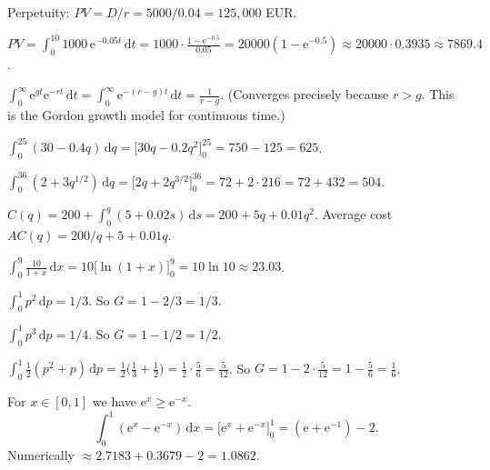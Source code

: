 \begin{solutions}
  \item Perpetuity: $PV=D/r=5000/0.04=125{,}000$ EUR.

  \item $\displaystyle PV=\int_{0}^{10} 1000\,\mathrm{e}^{-0.05t}\,\mathrm{d}t
        =1000\cdot\frac{1-\mathrm{e}^{-0.5}}{0.05}=20000(1-\mathrm{e}^{-0.5})
        \approx 20000\cdot 0.3935\approx 7869.4$.

  \item $\displaystyle\int_{0}^{\infty} \mathrm{e}^{gt}\mathrm{e}^{-rt}\,\mathrm{d}t
        =\int_{0}^{\infty} \mathrm{e}^{-(r-g)t}\,\mathrm{d}t=\frac{1}{r-g}$.
        (Converges precisely because $r>g$. This is the Gordon growth
        model for continuous time.)

  \item $\displaystyle\int_{0}^{25} (30-0.4q)\,\mathrm{d}q
        =\bigl[30q-0.2q^{2}\bigr]_{0}^{25}=750-125=625$.

  \item $\displaystyle\int_{0}^{36} (2+3q^{1/2})\,\mathrm{d}q
        =\bigl[2q+2q^{3/2}\bigr]_{0}^{36}=72+2\cdot 216=72+432=504$.

  \item $\displaystyle C(q)=200+\int_{0}^{q} (5+0.02s)\,\mathrm{d}s
        =200+5q+0.01q^{2}$. Average cost
        $AC(q)=200/q+5+0.01q$.

  \item $\displaystyle\int_{0}^{9} \frac{10}{1+x}\,\mathrm{d}x
        =10\bigl[\ln(1+x)\bigr]_{0}^{9}=10\ln 10\approx 23.03$.

  \item $\displaystyle\int_{0}^{1} p^{2}\,\mathrm{d}p=1/3$. So
        $G=1-2/3=1/3$.

  \item $\displaystyle\int_{0}^{1} p^{3}\,\mathrm{d}p=1/4$. So
        $G=1-1/2=1/2$.

  \item $\displaystyle\int_{0}^{1} \frac{1}{2}(p^{2}+p)\,\mathrm{d}p
        =\frac{1}{2}\bigl(\tfrac13+\tfrac12\bigr)=\frac{1}{2}\cdot\frac{5}{6}
        =\frac{5}{12}$. So $G=1-2\cdot\frac{5}{12}=1-\frac{5}{6}=\frac{1}{6}$.

  \item For $x\in[0,1]$ we have $\mathrm{e}^{x}\ge\mathrm{e}^{-x}$.
        \[
          \int_{0}^{1} (\mathrm{e}^{x}-\mathrm{e}^{-x})\,\mathrm{d}x
            =\bigl[\mathrm{e}^{x}+\mathrm{e}^{-x}\bigr]_{0}^{1}
            =(\mathrm{e}+\mathrm{e}^{-1})-2 .
        \]
        Numerically $\approx 2.7183+0.3679-2=1.0862$.


\end{solutions}
